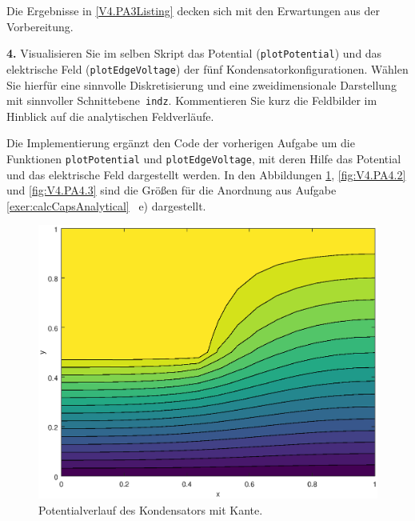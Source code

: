 \documentclass[./Protokollheft.tex]{subfiles}
\begin{document}
Die Ergebnisse in \ref{V4.PA3Listing} decken sich mit den Erwartungen aus der Vorbereitung.

 \label{v4.PA.4}
\begin{framed}
	\noindent \textbf{4.} Visualisieren Sie im selben Skript das Potential (\lstinline{plotPotential}) und das elektrische Feld (\lstinline{plotEdgeVoltage})
der fünf Kondensatorkonfigurationen. Wählen Sie hierfür eine sinnvolle Diskretisierung und eine zweidimensionale Darstellung mit sinnvoller Schnittebene~\lstinline{indz}. Kommentieren Sie kurz die Feldbilder im Hinblick auf die analytischen Feldverläufe.\label{exer:visualizeCapField}
\end{framed}

Die Implementierung ergänzt den Code der vorherigen Aufgabe um die Funktionen \lstinline{plotPotential} und \lstinline{plotEdgeVoltage}, mit deren Hilfe das Potential und das elektrische Feld dargestellt werden. In den Abbildungen \ref{fig:V4.PA4.1}, \ref{fig:V4.PA4.2} und \ref{fig:V4.PA4.3} sind die Größen für die Anordnung aus Aufgabe \ref{exer:calcCapsAnalytical} ~e) dargestellt.
\begin{figure}[htb]
\begin{center}
\includegraphics[scale=0.6]{eps/plotPot}
\end{center}
\caption[Potentialverlauf eines Kondensators mit Kante]{Potentialverlauf des Kondensators mit Kante.}
\label{fig:V4.PA4.1}
\end{figure}
\end{document}
